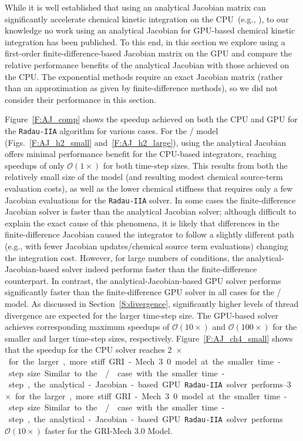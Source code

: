 \documentclass[preprint]{elsarticle}
\begin{document}
While it is well established that using an analytical Jacobian matrix can significantly accelerate chemical kinetic integration on the CPU~(e.g., \cite{Lu:2009gh,stone2014comparison,Schwer2002270}), to our knowledge no work using an analytical Jacobian for GPU-based chemical kinetic integration has been published.
To this end, in this section we explore using a first-order finite-difference-based Jacobian matrix on the GPU and compare the relative performance benefits of the analytical Jacobian with those achieved on the CPU.
The exponential methods require an exact Jacobian matrix (rather than an approximation as given by finite-difference methods), so we did not consider their performance in this section.

Figure~\ref{F:AJ_comp} shows the speedup achieved on both the CPU and GPU for the \texttt{Radau-IIA} algorithm for various cases.
For the \slash{} model (Figs.~\ref{F:AJ_h2_small} and~\ref{F:AJ_h2_large}), using the analytical Jacobian offers minimal performance benefit for the CPU-based integrators, reaching speedups of only $\mathcal{O}(\num{1}\times)$ for both time-step sizes.
This results from both the relatively small size of the model (and resulting modest chemical source-term evaluation costs), as well as the lower chemical stiffness that requires only a few Jacobian evaluations for the \texttt{Radau-IIA} solver.
In some cases the finite-difference Jacobian solver is faster than the analytical Jacobian solver; although difficult to explain the exact cause of this phenomena, it is likely that differences in the finite-difference Jacobian caused the integrator to follow a slightly different path (e.g., with fewer Jacobian updates\slash chemical source term evaluations) changing the integration cost.
However, for large numbers of conditions, the analytical-Jacobian-based solver indeed performs faster than the finite-difference counterpart.
In contrast, the analytical-Jacobian-based GPU solver performs significantly faster than the finite-difference GPU solver in all cases for the \slash{} model.
As discussed in Section~\ref{S:divergence}, significantly higher levels of thread divergence are expected for the larger time-step size.
The GPU-based solver achieves corresponding maximum speedups of $\mathcal{O}(\num{10}\times)$ and $\mathcal{O}(\num{100}\times)$ for the smaller and larger time-step sizes, respectively.
Figure~\ref{F:AJ_ch4_small} shows that the speedup for the CPU solver reaches \SIrange{2}{3}{$\times$} for the larger, more stiff GRI-Mech 3.0 model at the smaller time-step size.
Similar to the \slash{} case with the smaller time-step, the analytical-Jacobian-based GPU \texttt{Radau-IIA} solver performs $\mathcal{O}(10\times)$ faster for the GRI-Mech 3.0 Model.
\end{document}
